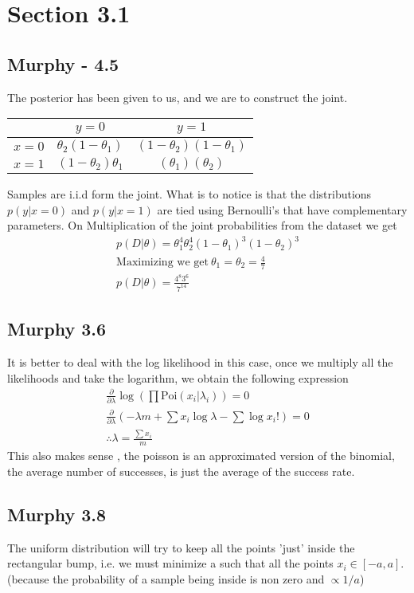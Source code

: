 \section{Section 3.1}
\subsection{Murphy - 4.5}
The posterior has been given to us, and we are to construct the joint.
\begin{center}
\begin{tabular}{c|c|c}
      &  $y = 0$  & $y = 1$ \\
     \hline
     $x  = 0$ &  $\theta_2(1 - \theta_1)$ & $(1 - \theta_2)(1 - \theta_1)$ \\
     \hline
     $x = 1$ &  $(1 - \theta_2)\theta_1$ &  $(\theta_1)( \theta_2)$ \\
     \hline
\end{tabular}
\end{center}
Samples are i.i.d form the joint. What is to notice is that the distributions 
$p(y| x = 0)$ and $p(y | x = 1)$ are tied using Bernoulli's that have complementary parameters.
On Multiplication  of the joint probabilities from the dataset we get 
\begin{gather}
    p(D | \theta) = \theta_1^4 \theta_2^4 (1  -  \theta_1)^3  ( 1 - \theta_2)^3
    \\
    \text{Maximizing we get} \ \theta_1 = \theta_2 = \frac{4}{7}
    \\
    p(D | \theta) = \frac{4^8 3^6}{7^{14}}
\end{gather}
\subsection{Murphy 3.6}
It is better to deal with the log likelihood in this case, once we multiply all the likelihoods and take the logarithm, we obtain the following expression
\begin{gather}
    \frac{\partial}{\partial \lambda} \log (\prod \text{Poi} (x_i | \lambda_i)) = 0 \\
    \frac{\partial}{\partial \lambda}(-\lambda m + \sum x_i \log \lambda  - \sum \log x_i! ) = 0 \\
    \therefore \lambda = \frac{\sum x_i}{m}
\end{gather}
This also makes sense , the poisson is an approximated version of the binomial, the average number of successes, is just the average of the success rate.


\subsection{Murphy 3.8}
The uniform distribution will try to keep all the points 'just' inside the rectangular bump, 
i.e. we must minimize a  such that all the points $x_i \in [-a , a]$.(because the probability of a sample being inside is non zero and $\propto 1/a$)

